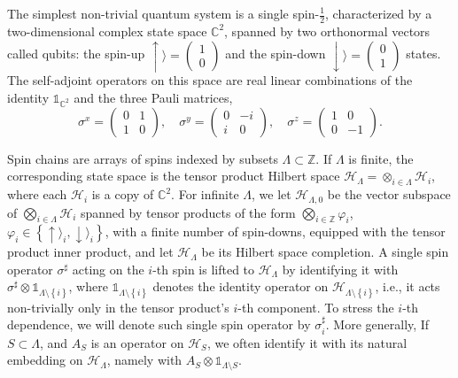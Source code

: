 \documentclass[12pt, a4paper,reqno]{amsart}
\numberwithin{equation}{section}
\newcommand\C{\mathbb C}
\newcommand\Z{\mathbb Z}
\newcommand\cH{\mathcal{H}}
\newcommand\vphi{\varphi}
\newcommand{\set}[1]{\left\{ #1 \right\}}
\newcommand\La{\Lambda}
\begin{document}
The simplest non-trivial quantum system is a single spin-$\frac 12$, characterized by a two-dimensional complex state space $\C^2$, spanned by  two orthonormal  vectors called qubits: the spin-up  $\uparrow\rangle = \begin{pmatrix} 1  \\ 0  \end{pmatrix} $ and the  spin-down  $\downarrow\rangle = \begin{pmatrix} 0  \\ 1 \end{pmatrix} $ states. The self-adjoint operators on this space are real linear combinations of the identity $\mathds{1}_{\C^2}$ and the three Pauli matrices,
\[\sigma^x=\begin{pmatrix}0& 1  \\1& 0  \end{pmatrix},\quad \sigma^y=\begin{pmatrix}0& -i  \\i& 0  \end{pmatrix},\quad \sigma^z=\begin{pmatrix}1& 0  \\0& -1  \end{pmatrix}.
\]

Spin chains are arrays of  spins indexed by subsets $\La\subset\Z$. If $\La$ is finite, the corresponding state space is the tensor product Hilbert space $\mathcal H_\Lambda=\otimes_{i\in \Lambda} \cH_i$, where each $\cH_i$ is a copy of $\C^2$. For infinite $\La$, we let  $\cH_{\La,0}$ be the vector subspace of $\bigotimes_{i\in \La}\cH_i$ spanned by    tensor products of the form  $\bigotimes_{i\in \Z}\vphi_i$,  $\vphi_i\in \set{\uparrow\rangle_i,\downarrow\rangle_i}$, with a finite number of spin-downs, equipped with   the tensor product inner product,  and let $\cH_\La$ be its Hilbert space completion. A single spin operator $\sigma^\sharp$ acting on the $i$-th spin is lifted to  $\mathcal H_\Lambda$  by identifying it with  $\sigma^\sharp \otimes \mathds{1}_{\La\setminus \set{i}}$, where $ \mathds{1}_{\La\setminus \set{i}}$ denotes the identity operator on $\cH_{\La\setminus \set{i}}$, i.e.,   it acts non-trivially only in the tensor product's $i$-th component. To stress the $i$-th dependence, we will denote such single spin operator by $\sigma^\sharp_i$. More generally,  If  $S\subset \La$, and $A_S$ is an operator on  $\cH_S$, we often  identify it with its natural embedding  on $\cH_\La$, namely with  $A_S \otimes \mathds{1}_{\La\setminus S}$. 
\end{document}
